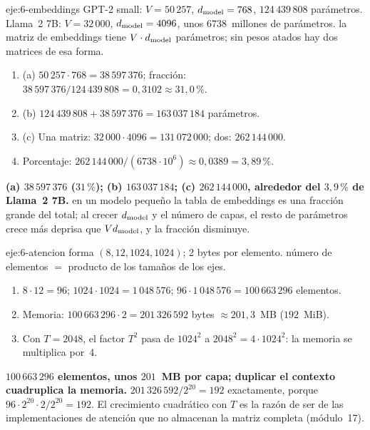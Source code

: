 \begin{solucion}{eje:6-embeddings}
\datos GPT-2 small: $V=50\,257$, $d_{\mathrm{model}}=768$, $124\,439\,808$ parámetros. Llama~2 7B: $V=32\,000$, $d_{\mathrm{model}}=4096$, unos $6738$~millones de parámetros.
\planteamiento la matriz de embeddings tiene $V\cdot d_{\mathrm{model}}$ parámetros; sin pesos atados hay dos matrices de esa forma.
\pasos
\begin{enumerate}[label=\arabic*.]
  \item (a) $50\,257\cdot 768=38\,597\,376$; fracción: $38\,597\,376/124\,439\,808=0{,}3102\approx 31{,}0\,\%$.
  \item (b) $124\,439\,808+38\,597\,376=163\,037\,184$ parámetros.
  \item (c) Una matriz: $32\,000\cdot 4096=131\,072\,000$; dos: $262\,144\,000$.
  \item Porcentaje: $262\,144\,000/(6738\cdot 10^{6})\approx 0{,}0389=3{,}89\,\%$.
\end{enumerate}
\resultado \textbf{(a) $38\,597\,376$ ($31\,\%$); (b) $163\,037\,184$; (c) $262\,144\,000$, alrededor del $3{,}9\,\%$ de Llama~2 7B.}
\comprobacion en un modelo pequeño la tabla de embeddings es una fracción grande del total; al crecer $d_{\mathrm{model}}$ y el número de capas, el resto de parámetros crece más deprisa que $Vd_{\mathrm{model}}$, y la fracción disminuye.
\end{solucion}

\begin{solucion}{eje:6-atencion}
\datos forma $(8,12,1024,1024)$; 2 bytes por elemento.
\planteamiento número de elementos $=$ producto de los tamaños de los ejes.
\pasos
\begin{enumerate}[label=\arabic*.]
  \item $8\cdot 12=96$; $1024\cdot 1024=1\,048\,576$; $96\cdot 1\,048\,576=100\,663\,296$ elementos.
  \item Memoria: $100\,663\,296\cdot 2=201\,326\,592$ bytes $\approx 201{,}3$~MB ($192$~MiB).
  \item Con $T=2048$, el factor $T^{2}$ pasa de $1024^{2}$ a $2048^{2}=4\cdot 1024^{2}$: la memoria se multiplica por~4.
\end{enumerate}
\resultado \textbf{$100\,663\,296$ elementos, unos $201$~MB por capa; duplicar el contexto cuadruplica la memoria.}
\comprobacion $201\,326\,592/2^{20}=192$ exactamente, porque $96\cdot 2^{20}\cdot 2/2^{20}=192$. El crecimiento cuadrático con $T$ es la razón de ser de las implementaciones de atención que no almacenan la matriz completa (módulo~17).
\end{solucion}


